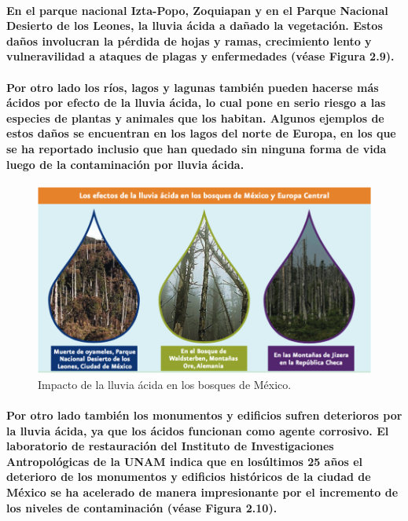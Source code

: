     \paragraph {En el parque nacional Izta-Popo, Zoquiapan y en el Parque Nacional Desierto de los Leones, la lluvia ácida a dañado la vegetación. Estos daños involucran la pérdida de hojas y ramas, crecimiento lento y vulneravilidad a ataques de plagas y enfermedades (véase Figura 2.9).}
  
    \paragraph {Por otro lado los ríos, lagos y lagunas también pueden hacerse más ácidos por efecto de la lluvia ácida, lo cual pone en serio riesgo a las especies de plantas y animales que los habitan. Algunos ejemplos de estos daños se encuentran en los lagos del norte de Europa, en los que se ha reportado inclusio que han quedado sin ninguna forma de vida luego de la contaminación por lluvia ácida.}

    \begin{figure}[h!]
      \centering
        \includegraphics[width=\textwidth]{./images/2.png}      
      \caption{Impacto de la lluvia ácida en los bosques de México.}
    \end{figure}    

    \paragraph {Por otro lado también los monumentos y edificios sufren deterioros por la lluvia ácida, ya que los ácidos funcionan como agente corrosivo. El laboratorio de restauración del Instituto de Investigaciones Antropológicas de la UNAM indica que en losúltimos 25 años el deterioro de los monumentos y edificios históricos de la ciudad de México se ha acelerado de manera impresionante por el incremento de los niveles de contaminación (véase Figura 2.10).}

